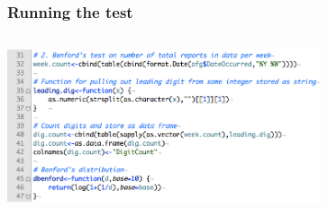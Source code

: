 \documentclass[xcolor=dvipsnames, 9pt]{beamer}
\begin{document}
\begin{frame}[fragile]
    \frametitle{Running the test}
    \begin{columns}
            \includegraphics[width=9.2cm]{r_code1.png}
             \\
            \vspace{8mm}
            \vspace{1.5cm}
            \vspace{1.7cm}
    \end{columns}
    \vspace{1mm}
    \hline
    \begin{columns}
            \begin{center}
            \end{center}
            \begin{center}
            \end{center}
            \begin{center}
            \end{center}
    \end{columns}
\end{frame}
\end{document}
